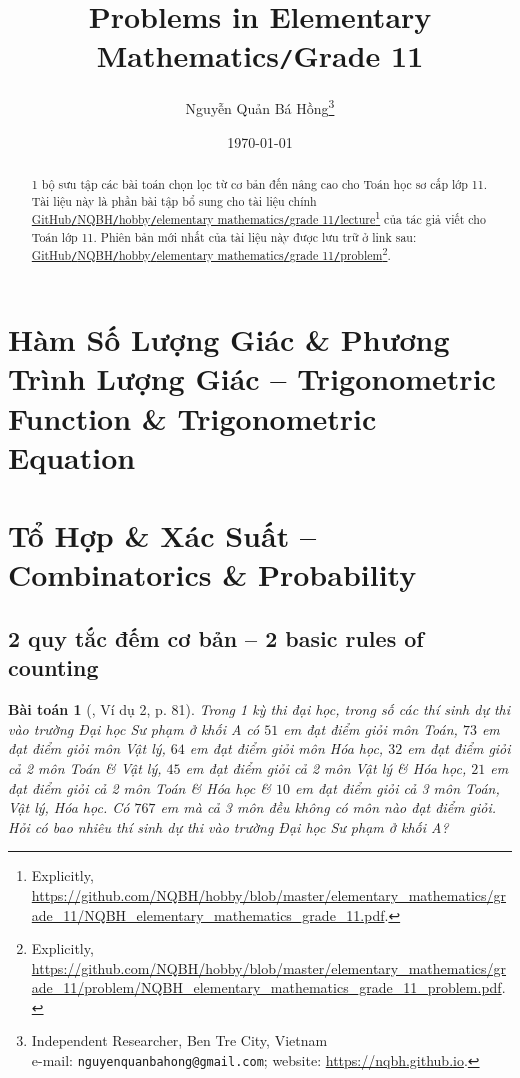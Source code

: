 \documentclass{article}
\title{Problems in Elementary Mathematics\texttt{/}Grade 11}
\author{Nguyễn Quản Bá Hồng\footnote{Independent Researcher, Ben Tre City, Vietnam\\e-mail: \texttt{nguyenquanbahong@gmail.com}; website: \url{https://nqbh.github.io}.}}
\date{\today}
\numberwithin{equation}{section}
\newtheorem{baitoan}{Bài toán}[section]
\begin{document}
\maketitle
\begin{abstract}
	1 bộ sưu tập các bài toán chọn lọc từ cơ bản đến nâng cao cho Toán học sơ cấp lớp 11. Tài liệu này là phần bài tập bổ sung cho tài liệu chính \href{https://github.com/NQBH/hobby/blob/master/elementary_mathematics/grade_11/NQBH_elementary_mathematics_grade_11.pdf}{GitHub\texttt{/}NQBH\texttt{/}hobby\texttt{/}elementary mathematics\texttt{/}grade 11\texttt{/}lecture}\footnote{Explicitly, \url{https://github.com/NQBH/hobby/blob/master/elementary_mathematics/grade_11/NQBH_elementary_mathematics_grade_11.pdf}.} của tác giả viết cho Toán lớp 11. Phiên bản mới nhất của tài liệu này được lưu trữ ở link sau: \href{https://github.com/NQBH/hobby/blob/master/elementary_mathematics/grade_11/problem/NQBH_elementary_mathematics_grade_11_problem.pdf}{GitHub\texttt{/}NQBH\texttt{/}hobby\texttt{/}elementary mathematics\texttt{/}grade 11\texttt{/}problem}\footnote{Explicitly, \url{https://github.com/NQBH/hobby/blob/master/elementary_mathematics/grade_11/problem/NQBH_elementary_mathematics_grade_11_problem.pdf}.}.
\end{abstract}
\tableofcontents
\newpage


\section{Hàm Số Lượng Giác \& Phương Trình Lượng Giác -- Trigonometric Function \& Trigonometric Equation}


\section{Tổ Hợp \& Xác Suất -- Combinatorics \& Probability}

\subsection{2 quy tắc đếm cơ bản -- 2 basic rules of counting}

\begin{baitoan}[\cite{TL_chuyen_Toan_Dai_So_Giai_Tich_11}, Ví dụ 2, p. 81]
	Trong 1 kỳ thi đại học, trong số các thí sinh dự thi vào trường Đại học Sư phạm ở khối A có $51$ em đạt điểm giỏi môn Toán, $73$ em đạt điểm giỏi môn Vật lý, $64$ em đạt điểm giỏi môn Hóa học, $32$ em đạt điểm giỏi cả 2 môn Toán \& Vật lý, $45$ em đạt điểm giỏi cả 2 môn Vật lý \& Hóa học, $21$ em đạt điểm giỏi cả 2 môn Toán \& Hóa học \& $10$ em đạt điểm giỏi cả 3 môn Toán, Vật lý, Hóa học. Có $767$ em mà cả 3 môn đều không có môn nào đạt điểm giỏi. Hỏi có bao nhiêu thí sinh dự thi vào trường Đại học Sư phạm ở khối A?
\end{baitoan}
\end{document}
